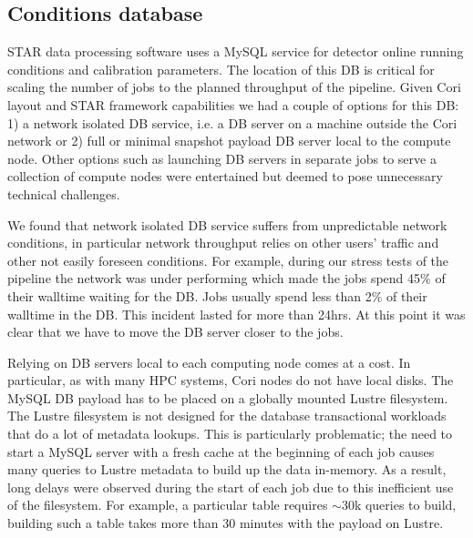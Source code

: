 \documentclass[a4paper]{jpconf}
\begin{document}
\subsection{Conditions database}
STAR data processing software uses a MySQL service for detector online running
conditions and calibration parameters. The location of this DB is critical for
scaling the number of jobs to the planned throughput of the pipeline. Given
Cori layout and STAR framework capabilities we had a couple of options for this
DB: 1) a network isolated DB service, i.e. a DB server on a machine outside the
Cori network or 2) full or minimal snapshot payload DB server local to the
compute node.  Other options such as launching DB servers in separate jobs to
serve a collection of compute nodes were entertained but deemed to pose
unnecessary technical challenges. 

We found that network isolated DB service suffers from unpredictable network
conditions, in particular network throughput relies on other users' traffic and
other not easily foreseen conditions. For example, during our stress tests of
the pipeline the network was under performing which made the jobs spend 45\% of
their walltime waiting for the DB. Jobs usually spend less than 2\% of their
walltime in the DB. This incident lasted for more than 24hrs. At this point it
was clear that we have to move the DB server closer to the jobs.

Relying on DB servers local to each computing node comes at a cost.  In
particular, as with many HPC systems, Cori nodes do not have local disks. The
MySQL DB payload has to be placed on a globally mounted Lustre filesystem. 
The Lustre filesystem is not designed for the database transactional workloads that
do a lot of metadata lookups. This is particularly problematic; the need to
start a MySQL server with a fresh cache at the beginning of each job causes many
queries to Lustre metadata to build up the data in-memory. As a result, long delays were
observed during the start of each job due to this inefficient use of the 
filesystem. For example, a particular table requires $\sim$30k queries to
build, building such a table takes more than 30 minutes with the payload on
Lustre. 
\end{document}
